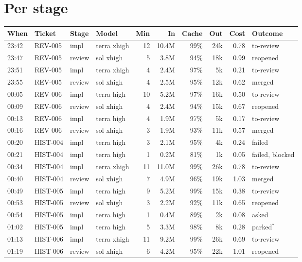 \documentclass[11pt,a4paper]{article}
\begin{document}
\section*{Per stage}

{\small
\begin{tabularx}{\linewidth}{@{}llllrrrrrX@{}}
\toprule
When & Ticket & Stage & Model & Min & In & Cache & Out & Cost & Outcome \\
\midrule
23:42 & REV-005 & impl & terra xhigh & 12 & 10.4M & 99\% & 24k & 0.78 & to-review \\
23:47 & REV-005 & review & sol xhigh & 5 & 3.8M & 94\% & 18k & 0.99 & reopened \\
23:51 & REV-005 & impl & terra xhigh & 4 & 2.4M & 97\% & 5k & 0.21 & to-review \\
23:55 & REV-005 & review & sol xhigh & 4 & 2.5M & 95\% & 12k & 0.62 & merged \\
00:05 & REV-006 & impl & terra high & 10 & 5.2M & 97\% & 16k & 0.50 & to-review \\
00:09 & REV-006 & review & sol xhigh & 4 & 2.4M & 94\% & 15k & 0.67 & reopened \\
00:13 & REV-006 & impl & terra high & 4 & 1.9M & 97\% & 5k & 0.17 & to-review \\
00:16 & REV-006 & review & sol xhigh & 3 & 1.9M & 93\% & 11k & 0.57 & merged \\
00:20 & HIST-004 & impl & terra high & 3 & 2.1M & 95\% & 4k & 0.24 & failed \\
00:21 & HIST-004 & impl & terra high & 1 & 0.2M & 81\% & 1k & 0.05 & failed, blocked \\
00:34 & HIST-004 & impl & terra xhigh & 11 & 11.0M & 99\% & 26k & 0.78 & to-review \\
00:40 & HIST-004 & review & sol xhigh & 7 & 4.9M & 96\% & 19k & 1.03 & merged \\
00:49 & HIST-005 & impl & terra high & 9 & 5.2M & 99\% & 15k & 0.38 & to-review \\
00:53 & HIST-005 & review & sol xhigh & 3 & 2.2M & 92\% & 11k & 0.65 & reopened \\
00:54 & HIST-005 & impl & terra high & 1 & 0.4M & 89\% & 2k & 0.08 & asked \\
01:02 & HIST-005 & impl & terra high & 5 & 3.3M & 98\% & 8k & 0.28 & parked$^{*}$ \\
01:13 & HIST-006 & impl & terra xhigh & 11 & 9.2M & 99\% & 26k & 0.69 & to-review \\
01:19 & HIST-006 & review & sol xhigh & 6 & 4.2M & 95\% & 22k & 1.01 & reopened \\

\end{tabularx}}
\end{document}
